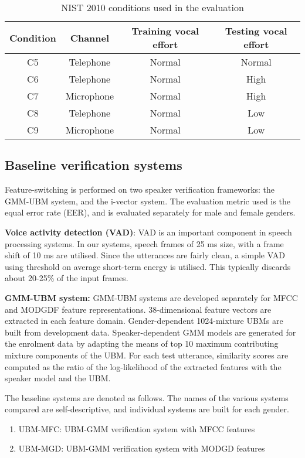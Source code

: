 \documentclass{article}
\begin{document}
\begin{table}[h!tb]
\centering
\caption{NIST 2010 conditions used in the evaluation}
\begin{tabular}{|c|c|c|c|}
\hline
Condition & Channel & Training vocal effort & Testing vocal effort \\ 
\hline \hline
C5 & Telephone & Normal & Normal \\ \hline
C6 & Telephone & Normal & High \\ \hline
C7 & Microphone & Normal & High \\ \hline
C8 & Telephone & Normal & Low \\ \hline
C9 & Microphone & Normal & Low \\ \hline
\end{tabular}
\label{tab:datasetConditions}
\end{table}



\subsection{Baseline verification systems}
\label{subsec:baseline}

Feature-switching is performed on two speaker verification frameworks: the GMM-UBM system, 
and the i-vector system. The evaluation
metric used is the equal error rate (EER), and is evaluated separately
for male and female genders.

\textbf{Voice activity detection (VAD)}: VAD is an important component in speech
processing systems. In our systems, speech frames of 25 ms size, with a frame
shift of 10 ms are utilised. Since the utterances are fairly clean, a simple VAD
using threshold on average short-term energy is utilised. This typically
discards about 20-25\% of the input frames.

\textbf{GMM-UBM system:} GMM-UBM systems are developed separately for 
MFCC and MODGDF feature representations. 38-dimensional feature vectors are 
extracted in each feature domain. Gender-dependent 1024-mixture UBMs are built 
from development data.  Speaker-dependent GMM models are generated for the 
enrolment data by adapting the means of top 10 maximum contributing mixture 
components of the UBM. For each test utterance, similarity scores are computed 
as the ratio of the log-likelihood of the extracted features with the speaker
model and the UBM.

The baseline systems are denoted as follows. The names of the various systems
compared are self-descriptive, and individual systems are built for each gender.
\begin{enumerate}
\item UBM-MFC: UBM-GMM verification system with MFCC features
\item UBM-MGD: UBM-GMM verification system with MODGD features
\end{enumerate}
\end{document}
